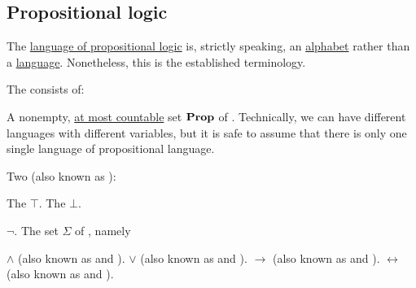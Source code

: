 \subsection{Propositional logic}\label{subsec:propositional_logic}

\begin{remark}\label{rem:propositional_language_is_alphabet}
  The \hyperref[def:propositional_language]{language of propositional logic} is, strictly speaking, an \hyperref[def:formal_language/alphabet]{alphabet} rather than a \hyperref[def:formal_language/language]{language}. Nonetheless, this is the established terminology.
\end{remark}

\begin{definition}\label{def:propositional_language}
  The  consists of:

  \begin{thmenum}
     A nonempty, \hyperref[def:set_countability/at_most_countable]{at most countable} set \( \operatorname{\mathbf{Prop}} \) of . Technically, we can have different languages with different variables, but it is safe to assume that there is only one single language of propositional language.

     Two  (also known as ):
    \begin{thmenum}
       The  \( \top \).
       The  \( \bot \).
    \end{thmenum}

      \( \neg \).
     The set \( \Sigma \) of , namely
    \begin{thmenum}
        \( \wedge \) (also known as \hyperref[def:standard_boolean_operators]{} and \hyperref[def:semilattice/meet]{}).
        \( \vee \) (also known as \hyperref[def:standard_boolean_operators]{} and \hyperref[def:semilattice/join]{}).
        \( \rightarrow \) (also known as  and \hyperref[def:material_implication]{}).
        \( \leftrightarrow \) (also known as  and ).
    \end{thmenum}


\end{thmenum}
\end{definition}
